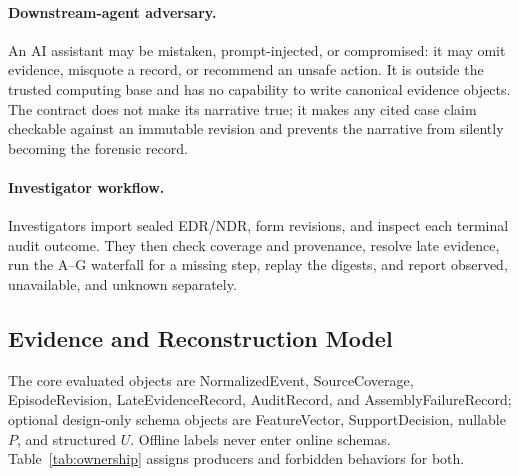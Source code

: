 \paragraph{Downstream-agent adversary.}
An AI assistant may be mistaken, prompt-injected, or compromised: it may omit evidence, misquote a
record, or recommend an unsafe action. It is outside the trusted computing base and has no
capability to write canonical evidence objects. The contract does not make its narrative true; it
makes any cited case claim checkable against an immutable revision and prevents the narrative from
silently becoming the forensic record.

\paragraph{Investigator workflow.}
Investigators import sealed EDR/NDR, form revisions, and inspect each terminal audit outcome.
They then check coverage and provenance, resolve late evidence, run the A--G waterfall for a
missing step, replay the digests, and report observed, unavailable, and unknown separately.

\subsection{Evidence and Reconstruction Model}
\label{sec:problem-formulation}

The core evaluated objects are NormalizedEvent, SourceCoverage, EpisodeRevision,
LateEvidenceRecord, AuditRecord, and AssemblyFailureRecord; optional design-only schema objects
are FeatureVector, SupportDecision, nullable $P$, and structured $U$. Offline labels never enter
online schemas. Table~\ref{tab:ownership} assigns producers and forbidden behaviors for both.

